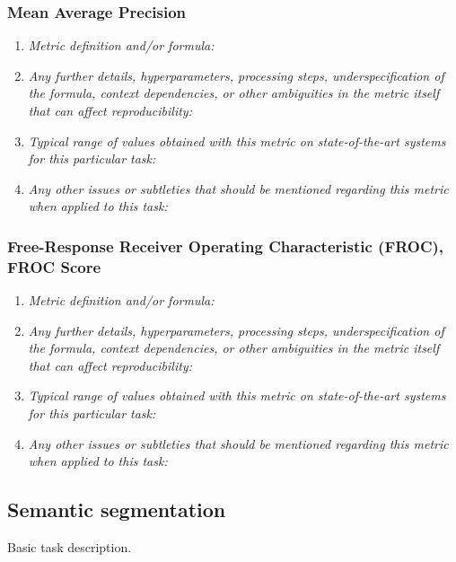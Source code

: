 \documentclass[a4paper,11pt]{article}
\begin{document}
        \subsubsection{Mean Average Precision}
            \begin{enumerate}[label=\alph*.]
                \item \textit{Metric definition and/or formula:}
                \bigskip
                \item \textit{Any further details, hyperparameters, processing steps, underspecification of the formula, context dependencies, or other ambiguities in the metric itself that can affect reproducibility:}
                \bigskip
                \item \textit{Typical range of values obtained with this metric on state-of-the-art systems for this particular task:}
                \bigskip
                \item \textit{Any other issues or subtleties that should be mentioned regarding this metric when applied to this task:}
                \bigskip
            \end{enumerate}
        \subsubsection{Free-Response Receiver Operating Characteristic (FROC), FROC Score}
            \begin{enumerate}[label=\alph*.]
                \item \textit{Metric definition and/or formula:}
                \bigskip
                \item \textit{Any further details, hyperparameters, processing steps, underspecification of the formula, context dependencies, or other ambiguities in the metric itself that can affect reproducibility:}
                \bigskip
                \item \textit{Typical range of values obtained with this metric on state-of-the-art systems for this particular task:}
                \bigskip
                \item \textit{Any other issues or subtleties that should be mentioned regarding this metric when applied to this task:}
                \bigskip
            \end{enumerate}

    \subsection{Semantic segmentation}
        Basic task description.
\end{document}
